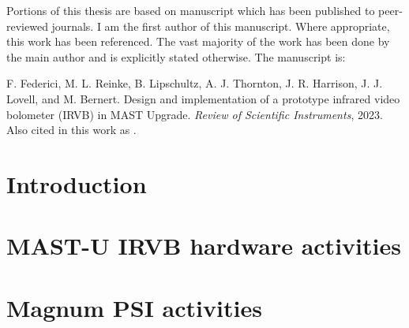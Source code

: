\documentclass[]{yorkThesis}  %
\begin{document}
{Portions of this thesis are based on manuscript which has been published to peer-reviewed journals. I am the first author of this manuscript. Where appropriate, this work has been referenced. The vast majority of the work has been done by the main author and is explicitly stated otherwise. The manuscript is:

F. Federici, M. L. Reinke, B. Lipschultz, A. J. Thornton, J. R. Harrison, J. J. Lovell, and M. Bernert. Design and implementation of a prototype infrared video bolometer (IRVB) in MAST Upgrade. \emph{Review of Scientific Instruments}, 2023. Also cited in this work as \cite{Federici2023}.






\pagestyle{headings}
\chapter{Introduction}\label{chapter1}





\chapter{MAST-U IRVB hardware activities}\label{chapter2}


\chapter{Magnum PSI activities}\label{chapter3}





\appendix

%

}
\end{document}
